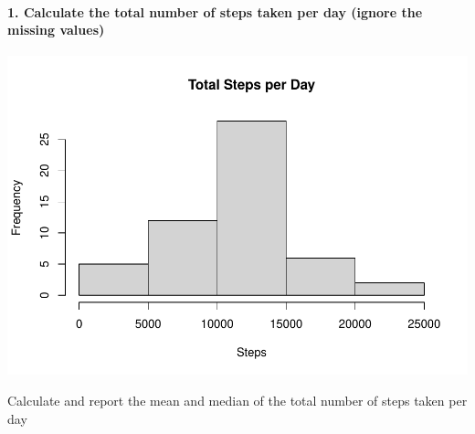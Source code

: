 \documentclass[
]{article}
\newenvironment{Shaded}{\begin{snugshade}}{\end{snugshade}}
\newcommand{\AttributeTok}[1]{\textcolor[rgb]{0.77,0.63,0.00}{#1}}
\newcommand{\CommentTok}[1]{\textcolor[rgb]{0.56,0.35,0.01}{\textit{#1}}}
\newcommand{\DecValTok}[1]{\textcolor[rgb]{0.00,0.00,0.81}{#1}}
\newcommand{\FunctionTok}[1]{\textcolor[rgb]{0.00,0.00,0.00}{#1}}
\newcommand{\NormalTok}[1]{#1}
\newcommand{\OtherTok}[1]{\textcolor[rgb]{0.56,0.35,0.01}{#1}}
\newcommand{\SpecialCharTok}[1]{\textcolor[rgb]{0.00,0.00,0.00}{#1}}
\newcommand{\StringTok}[1]{\textcolor[rgb]{0.31,0.60,0.02}{#1}}
\begin{document}
\hypertarget{calculate-the-total-number-of-steps-taken-per-day-ignore-the-missing-values}{%
\paragraph{1. Calculate the total number of steps taken per day (ignore
the missing
values)}\label{calculate-the-total-number-of-steps-taken-per-day-ignore-the-missing-values}}

\begin{Shaded}
\end{Shaded}

\includegraphics{project_1_files/figure-latex/daily_total-1.pdf}

Calculate and report the mean and median of the total number of steps
taken per day

\begin{Shaded}
\end{Shaded}
\end{document}
